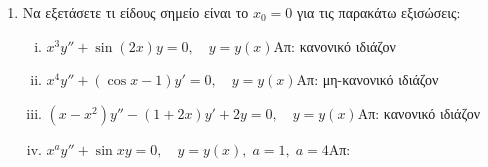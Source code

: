 


\pagestyle{empty}



\begin{center}
  \minibox{\large\bfseries \textcolor{Col1}{Ασκήσεις Στη Μέθοδο Σειρών}}
\end{center}

\vspace{\baselineskip}

\begin{enumerate}
\item Να εξετάσετε τι είδους σημείο είναι το $x_0=0$ για τις παρακάτω εξισώσεις:
\begin{enumerate}[i)]
\item $x^3y''+\sin(2x)y=0, \quad y=y(x)$\hfill Απ: κανονικό ιδιάζον
\item $x^4y'' + (\cos x-1)y'=0, \quad y=y(x)$\hfill Απ: μη-κανονικό ιδιάζον
\item $(x-x^2)y''-(1+2x)y'+2y=0, \quad y=y(x)$\hfill Απ: κανονικό ιδιάζον
\item $x^{a}y''+\sin x y=0, \quad y=y(x), \; a=1, \; a=4$\hfill Απ: 
\end{enumerate}


\end{enumerate}
